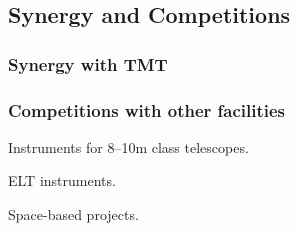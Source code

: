 \par{}

\par{}

\par{}

\subsection{Synergy and Competitions}

\subsubsection{Synergy with TMT}

\subsubsection{Competitions with other facilities}

Instruments for 8--10m class telescopes.

ELT instruments.

Space-based projects.



